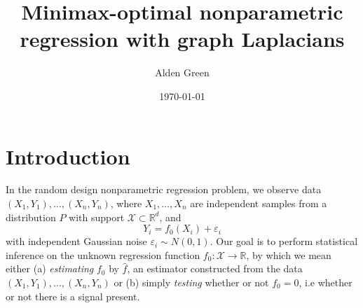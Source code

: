 \documentclass{article}
\newcommand{\Reals}{\mathbb{R}}
\newcommand{\1}{\mathbf{1}}
\newcommand{\Rd}{\Reals^d}
\newcommand{\Xset}{\mathcal{X}}
\newcommand{\wh}[1]{\widehat{#1}}
\theoremstyle{alden}
\theoremstyle{aldenthm}
\theoremstyle{definition}
\theoremstyle{remark}
\begin{document}
\title{Minimax-optimal nonparametric regression with graph Laplacians}
\author{Alden Green}
\date{\today}
\maketitle

\section{Introduction}

In the random design nonparametric regression problem, we observe data $(X_1,Y_1),\ldots,(X_n,Y_n)$, where $X_1,\ldots,X_n$ are independent samples from a distribution $P$ with support $\Xset \subset \Rd$, and 
\begin{equation}
\label{eqn:random_design_regression}
Y_i = f_0(X_i) + \varepsilon_i
\end{equation}
with independent Gaussian noise $\varepsilon_i \sim N(0,1)$. Our goal is to perform statistical inference on the unknown regression function $f_0: \Xset \to \Reals$, by which we mean either (a) \emph{estimating} $f_0$ by $\wh{f}$, an estimator constructed from the data $(X_1,Y_1),\ldots,(X_n,Y_n)$ or (b) simply \emph{testing} whether or not $f_0 = 0$, i.e whether or not there is a signal present. 
\end{document}
